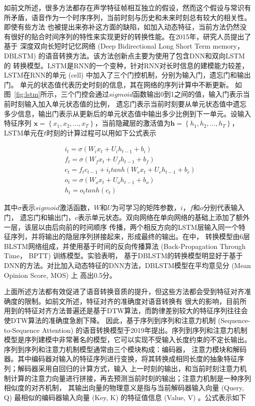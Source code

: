 如前文所述，很多方法都存在声学特征帧相互独立的假设，然而这个假设与常识有所矛盾，语音作为一个时序序列，当前时刻与历史和未来时刻总有较大的相关性。即使有些方法
也被提出来弥补这方面的缺陷，如加入动态特征，当前方法仍然没有很好的贴合时间序列的特性来实现更好的转换性能。在2015年，研究人员提出了基于
深度双向长短时记忆网络 (Deep Bidirectional Long Short Term memory， DBLSTM) 的语音转换方法\cite{sun2015voice}。该方法创新点主要为使用了包含DNN和双向LSTM的
转换模型。LSTM是RNN的一个变种，针对RNN对长时信息的建模能力较差，LSTM在RNN的单元 (cell) 中加入了三个门控机制，分别为输入门，遗忘门和输出门。
单元的状态值代表历史时刻的信息，其在网络的序列计算中不断更新。
如图~\ref{fig:lstm}所示，三个门控会通过$sigmoid$函数输出0到1之间的值，输入门表示当前时刻输入加入单元状态值的比例，
遗忘门表示当前时刻要从单元状态值中遗忘多少信息，输出门表示从更新后的单元状态值中输出多少比例到下一单元。设输入特征序列
$\mathbf{x}=\left\{x_1,x_2,...,x_T\right\}$，当前隐藏层的激活值为$\mathbf{h}=\left\{h_1,h_2,...,h_T\right\}$，
LSTM单元在$t$时刻的计算过程可以用如下公式表示

\begin{align}
    & i_t = \sigma (W_{i}x_t + U_ih_{t-1}+b_i) \\
    & f_t = \sigma (W_{f}x_t + U_fh_{t-1}+b_f) \\
    & c_t = f_tc_{t-1} + i_ttanh(W_cx_t+U_ch_{t-1}+b_c) \\
    & o_t = \sigma (W_{o}x_t + U_oh_{t-1}+b_o) \\
    & h_t = o_ttanh(c_t)
\end{align}
  
其中$\sigma$表示$sigmoid$激活函数，$W$和$U$为可学习的矩阵参数，$i$，$f$和$o$分别代表输入门，
遗忘门和输出门，$c$表示单元状态。双向网络在单向网络的基础上添加了额外一层，该层以由后向前的时间顺序
传播，两个相反方向的LSTM层输入同一个特征序列，并将输出的隐层序列拼接起来，形成最终的输出。在\cite{sun2015voice}中，
转换模型由6层BLSTM网络组成，并使用基于时间的反向传播算法 (Back-Propagation Through Time， BPTT) 训练模型。实验表明，
基于DBLSTM的转换模型明显好于基于DNN的方法。对比加入动态特征的DNN方法，DBLSTM模型在平均意见分 (Mean Opinion Score, MOS) 上
高出0.5分。

上面所述方法都有效促进了语音转换音质的提升，但这些方法都会受到特征对齐准确度的限制。如前文所述，特征对齐的准确度对语音转换有
很大的影响，目前所用到的特征对齐方法普遍还是基于DTW算法，而韵律差别较大的特征序列往往会使DTW算法的准确度急剧下降。
因此，基于序列到序列和注意力机制 (Sequence-to-Sequence Attention) 的语音转换模型于2019年提出\cite{tanaka2019atts2s}。序列到序列和注意力机制
模型是序列建模中非常著名的模型，它可以实现不受输入长度约束的不定长输出。序列到序列和注意力机制模型通常由三个模块构成：编码器，
注意力模块和解码器。其中编码器对输入的特征序列进行变换，将其转换成相同长度的抽象特征序列；解码器采用自回归的计算方式，输入
上一时刻的输出，和当前时刻注意力机制计算的注意力向量进行拼接，再去预测当前时刻的输出；注意力机制是一种序列相似度的对齐机制，
其输出向量的物理意义是指与当前解码器输入向量 (Query, Q) 最相似的编码器输入向量 (Key, K) 的特征值信息 (Value, V) 。公式表示如下

